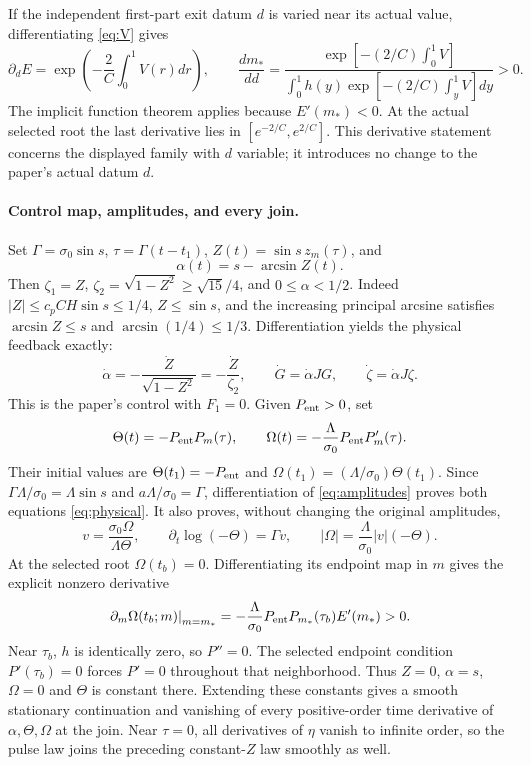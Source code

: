 \documentclass[11pt]{article}
\begin{document}
If the independent first-part exit datum $d$ is varied near its actual
value, differentiating \eqref{eq:V} gives
\[
 \partial_dE=\exp\!\left(-\frac2C\int_0^1V(r)dr\right),\qquad
 \frac{dm_*}{dd}=
 \frac{\exp[-(2/C)\int_0^1V]}{
 \int_0^1h(y)\exp[-(2/C)\int_y^1V]dy}>0.
\]
The implicit function theorem applies because $E'(m_*)<0$.
At the actual selected root the last derivative lies in
$[e^{-2/C},e^{2/C}]$. This derivative statement concerns the displayed
family with $d$ variable; it introduces no change to the paper's actual
datum $d$.

\paragraph{Control map, amplitudes, and every join.}
Set $\Gamma=\sigma _0\sin s$, $\tau=\Gamma(t-t_1)$,
$Z(t)=\sin s\,z_m(\tau)$, and
\[
 \alpha(t)=s-\arcsin Z(t).
\]
Then $\zeta_1=Z$, $\zeta_2=\sqrt{1-Z^2}\geq\sqrt{15}/4$,
and $0\leq\alpha<1/2$. Indeed $|Z|\leq c_pCH\sin s\leq1/4$,
$Z\leq\sin s$, and the increasing principal arcsine satisfies
$\arcsin Z\leq s$ and $\arcsin(1/4)\leq1/3$.
Differentiation yields the physical feedback exactly:
\[
 \dot\alpha=-\frac{\dot Z}{\sqrt{1-Z^2}}
            =-\frac{\dot Z}{\zeta_2},\qquad
 \dot G=\dot\alpha JG,\qquad \dot\zeta=\dot\alpha J\zeta.
\]
This is the paper's control with $F_1=0$. Given $P_{\rm ent}>0$, set
\begin{equation}\label{eq:amplitudes}
 \Theta(t)=-P_{\rm ent}P_m(\tau),\qquad
 \Omega(t)=-\frac\Lambda{\sigma _0}P_{\rm ent}P_m'(\tau).
\end{equation}
Their initial values are $\Theta(t_1)=-P_{\rm ent}$ and
$\Omega(t_1)=(\Lambda/\sigma _0)\Theta(t_1)$.
Since $\Gamma\Lambda/\sigma _0=\Lambda\sin s$ and
$a\Lambda/\sigma _0=\Gamma$, differentiation of
\eqref{eq:amplitudes} proves both equations \eqref{eq:physical}.
It also proves, without changing the original amplitudes,
\[
 v=\frac{\sigma _0\Omega}{\Lambda\Theta},\qquad
 \partial_t\log(-\Theta)=\Gamma v,\qquad
 |\Omega|=\frac\Lambda{\sigma _0}|v|(-\Theta).
\]
At the selected root $\Omega(t_b)=0$. Differentiating its endpoint
map in $m$ gives the explicit nonzero derivative
\[
 \left.\partial_m\Omega(t_b;m)\right|_{m=m_*}
=-\frac\Lambda{\sigma _0}P_{\rm ent}P_{m_*}(\tau_b)E'(m_*)>0.
\]
Near $\tau_b$, $h$ is identically zero, so $P''=0$.
The selected endpoint condition $P'(\tau_b)=0$ forces $P'=0$
throughout that neighborhood. Thus $Z=0$, $\alpha=s$, $\Omega=0$
and $\Theta$ is constant there. Extending these constants gives a smooth
stationary continuation and vanishing of every positive-order time
derivative of $\alpha,\Theta,\Omega$ at the join. Near $\tau=0$,
all derivatives of $\eta$ vanish to infinite order, so the pulse law
joins the preceding constant-$Z$ law smoothly as well.
\end{document}
